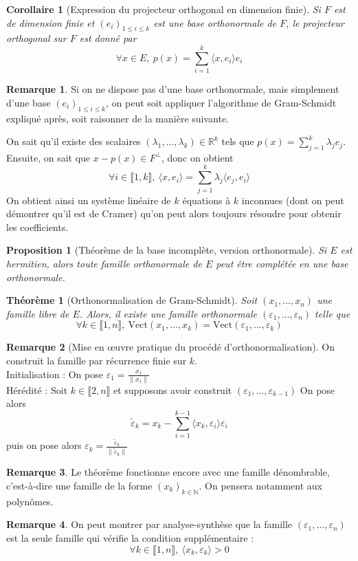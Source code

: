 \documentclass[french]{article}
\newcommand{\N}{\mathbb{N}}
\newcommand{\R}{\mathbb{R}}
\newcommand{\vect}{\text{Vect}}
\theoremstyle{plain}
\newtheorem{thm}{Théorème}
\newtheorem{prop}{Proposition}
\newtheorem{cor}{Corollaire}
\theoremstyle{definition}
\newtheorem{rmq}{Remarque}
\begin{document}
\begin{cor}[Expression du projecteur orthogonal en dimension finie]
	Si $F$ est de dimension finie et $(e_i)_{1\leqslant i\leqslant k}$ est une base orthonormale de $F$, le projecteur orthogonal sur $F$ est donné par $$\forall x\in E,\ p(x)=\sum_{i=1}^{k}\langle x,e_i\rangle e_i$$
\end{cor}
\begin{rmq} Si on ne dispose pas d'une base orthonormale, mais simplement d'une base $(e_i)_{1\leqslant i\leqslant k}$, on peut soit appliquer l'algorithme de Gram-Schmidt expliqué après, soit raisonner de la manière suivante. \end{rmq}
\par On sait qu'il existe des scalaires $(\lambda_1,\ldots,\lambda_k)\in\R^k$ tels que $\displaystyle p(x)=\sum_{j=1}^{k}\lambda_je_j$. Ensuite, on sait que $x-p(x)\in F^\perp$, donc on obtient $$\forall i\in\llbracket1,k\rrbracket,\ \langle x,e_i\rangle = \sum_{j=1}^{k}\lambda_j\langle e_j,e_i\rangle$$ On obtient ainsi un système linéaire de $k$ équations à $k$ inconnues (dont on peut démontrer qu'il est de Cramer) qu'on peut alors toujours résoudre pour obtenir les coefficients.
\begin{prop}[Théorème de la base incomplète, version orthonormale]
	Si $E$ est hermitien, alors toute famille orthonormale de $E$ peut être complétée en une base orthonormale.
\end{prop}
\begin{thm}[Orthonormalisation de Gram-Schmidt]
	Soit $(x_1,\ldots,x_n)$ une famille libre de $E$. Alors, il existe une famille orthonormale $(\varepsilon_1,\ldots,\varepsilon_n)$ telle que $$\forall k\in\llbracket1,n\rrbracket,\ \vect(x_1,\ldots,x_k)=\vect(\varepsilon_1,\ldots,\varepsilon_k)$$
\end{thm}
\begin{rmq}[Mise en œuvre pratique du procédé d'orthonormalisation] On construit la famille par récurrence finie sur $k$. \\ Initialisation : On pose $\displaystyle \varepsilon_1=\frac{x_1}{\lVert x_1\rVert}$ \\ Hérédité : Soit $k\in\llbracket2,n\rrbracket$ et supposons avoir construit $(\varepsilon_1,\ldots,\varepsilon_{k-1})$ On pose alors $$\tilde{\varepsilon}_k=x_k-\sum_{i=1}^{k-1}\langle x_k,\varepsilon_i\rangle\varepsilon_i$$ puis on pose alors $\displaystyle \varepsilon_k=\frac{\tilde{\varepsilon}_k}{\lVert \tilde{\varepsilon}_k\rVert}$ \end{rmq}
\begin{rmq} Le théorème fonctionne encore avec une famille dénombrable, c'est-à-dire une famille de la forme $(x_k)_{k\in\N}$. On pensera notamment aux polynômes. \end{rmq}
\begin{rmq} On peut montrer par analyse-synthèse que la famille $(\varepsilon_1,\ldots,\varepsilon_n)$ est la seule famille qui vérifie la condition supplémentaire : $$\forall k\in\llbracket1,n\rrbracket,\ \langle x_k,\varepsilon_k\rangle >0$$ \end{rmq}
\end{document}
